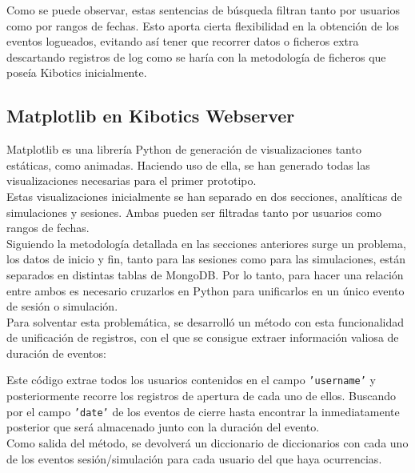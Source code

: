 \documentclass[11pt,a4paper]{book}
\begin{document}
			Como se puede observar, estas sentencias de búsqueda filtran tanto por usuarios como por rangos de fechas. Esto aporta cierta flexibilidad en la obtención de los eventos logueados, evitando así tener que recorrer datos o ficheros extra descartando registros de log como se haría con la metodología de ficheros que poseía Kibotics inicialmente.
			
			\subsection{Matplotlib en Kibotics Webserver}
			Matplotlib es una librería Python de generación de visualizaciones tanto estáticas, como animadas. Haciendo uso de ella, se han generado todas las visualizaciones necesarias para el primer prototipo.\\
						
			Estas visualizaciones inicialmente se han separado en dos secciones, analíticas de simulaciones y sesiones. Ambas pueden ser filtradas tanto por usuarios como rangos de fechas.\\
			
			Siguiendo la metodología detallada en las secciones anteriores surge un problema, los datos de inicio y fin, tanto para las sesiones como para las simulaciones, están separados en distintas tablas de MongoDB. Por lo tanto, para hacer una relación entre ambos es necesario cruzarlos en Python para unificarlos en un único evento de sesión o simulación. \\
			
			Para solventar esta problemática, se desarrolló un método con esta funcionalidad de unificación de registros, con el que se consigue extraer información valiosa de duración de eventos:
			
			Este código extrae todos los usuarios contenidos en el campo \texttt{'username'} y posteriormente recorre los registros de apertura de cada uno de ellos. Buscando por el campo \texttt{'date'} de los eventos de cierre hasta encontrar la inmediatamente posterior que será almacenado junto con la duración del evento. \\
			
			Como salida del método, se devolverá un diccionario de diccionarios con cada uno de los eventos sesión/simulación para cada usuario del que haya ocurrencias.\\
			
\end{document}
